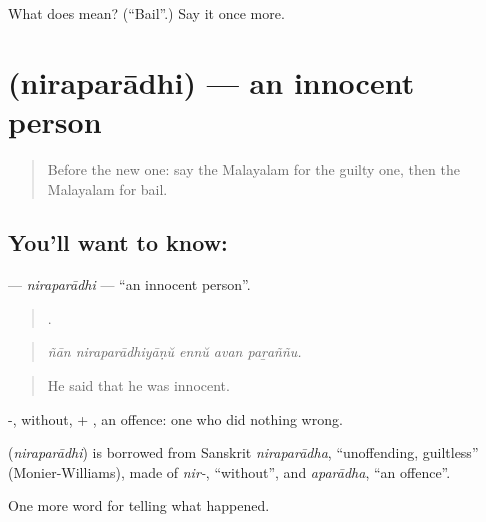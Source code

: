 \begin{tcolorbox}[breakable,colback=teal!4,colframe=teal!35!black,title={Before you move on}]
What does  mean? (\textquotedblleft{}Bail\textquotedblright{}.) Say it once more.
\end{tcolorbox}
\section[\texorpdfstring{\ml{നിരപരാധി} (niraparādhi)}{നിരപരാധി (niraparādhi)}]{ (niraparādhi) — an innocent person}

\label{lesson:ML-C369-niraparadhi}



\begin{quote}
Before the new one: say the Malayalam for the guilty one, then the Malayalam for bail.
\end{quote}

\subsection*{You'll want to know: }
\textbf{} — \emph{niraparādhi} — \textquotedblleft{}an innocent person\textquotedblright{}.

\begin{quote}
    .
\end{quote}

\begin{quote}
\emph{ñān niraparādhiyāṇŭ ennŭ avan paṟaññu.}
\end{quote}

\begin{quote}
He said that he was innocent.
\end{quote}

-, without, + , an offence: one who did nothing wrong.

\begin{cousinweb}
\textbf{} (\emph{niraparādhi}) is borrowed from Sanskrit \emph{niraparādha}, \textquotedblleft{}unoffending, guiltless\textquotedblright{} (Monier-Williams), made of \emph{nir-}, \textquotedblleft{}without\textquotedblright{}, and \emph{aparādha}, \textquotedblleft{}an offence\textquotedblright{}.
\end{cousinweb}

\begin{grammarlens}[title={What you've built}]
One more word for telling what happened.
\end{grammarlens}

